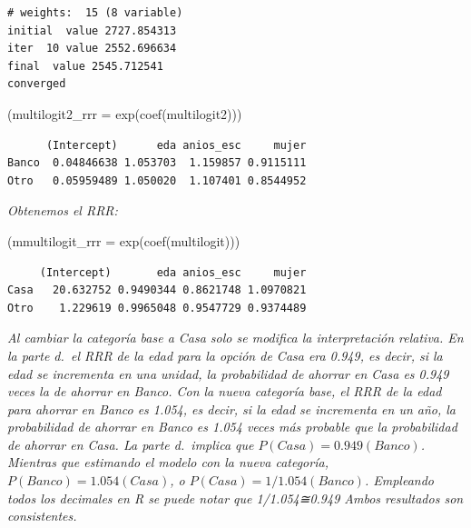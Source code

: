 \documentclass[
  letterpaper,
  DIV=11,
  numbers=noendperiod]{scrartcl}
\newenvironment{Shaded}{\begin{snugshade}}{\end{snugshade}}
\newcommand{\AttributeTok}[1]{\textcolor[rgb]{0.40,0.45,0.13}{#1}}
\newcommand{\FunctionTok}[1]{\textcolor[rgb]{0.28,0.35,0.67}{#1}}
\newcommand{\NormalTok}[1]{\textcolor[rgb]{0.00,0.23,0.31}{#1}}
\begin{document}
\begin{verbatim}
# weights:  15 (8 variable)
initial  value 2727.854313 
iter  10 value 2552.696634
final  value 2545.712541 
converged
\end{verbatim}

\begin{Shaded}
\begin{Highlighting}[]
\NormalTok{(}\AttributeTok{multilogit2\_rrr =} \FunctionTok{exp}\NormalTok{(}\FunctionTok{coef}\NormalTok{(multilogit2)))}
\end{Highlighting}
\end{Shaded}

\begin{verbatim}
      (Intercept)      eda anios_esc     mujer
Banco  0.04846638 1.053703  1.159857 0.9115111
Otro   0.05959489 1.050020  1.107401 0.8544952
\end{verbatim}

\emph{Obtenemos el RRR:}

\begin{Shaded}
\begin{Highlighting}[]
\NormalTok{(}\AttributeTok{mmultilogit\_rrr =} \FunctionTok{exp}\NormalTok{(}\FunctionTok{coef}\NormalTok{(multilogit)))}
\end{Highlighting}
\end{Shaded}

\begin{verbatim}
     (Intercept)       eda anios_esc     mujer
Casa   20.632752 0.9490344 0.8621748 1.0970821
Otro    1.229619 0.9965048 0.9547729 0.9374489
\end{verbatim}

\emph{Al cambiar la categoría base a Casa solo se modifica la
interpretación relativa. En la parte d.~el RRR de la edad para la opción
de Casa era 0.949, es decir, si la edad se incrementa en una unidad, la
probabilidad de ahorrar en Casa es 0.949 veces la de ahorrar en Banco.
Con la nueva categoría base, el RRR de la edad para ahorrar en Banco es
1.054, es decir, si la edad se incrementa en un año, la probabilidad de
ahorrar en Banco es 1.054 veces más probable que la probabilidad de
ahorrar en Casa. La parte d.~implica que \(P(Casa)=0.949(Banco)\).
Mientras que estimando el modelo con la nueva categoría,
\(P(Banco)=1.054(Casa)\), o \(P(Casa)=1/1.054(Banco)\). Empleando todos
los decimales en R se puede notar que 1/1.054≅0.949 Ambos resultados son
consistentes.}
\end{document}

